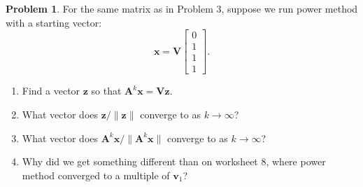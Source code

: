 \documentclass[12pt]{article}
\theoremstyle{definition}
\newtheorem{problem}{Problem}
\renewcommand{\vec}{\mathbf}
\begin{document}
 
\begin{problem}
For the same matrix as in Problem 3, suppose we run power method with a starting vector:
\[
\vec{x} = \vec{V}\begin{bmatrix}0\\1\\1\\1\end{bmatrix}.
\]

    \begin{enumerate}
        \item Find a vector $\vec{z}$ so that $\vec{A}^k \vec{x} = \vec{V} \vec{z}$.
        
        \item What vector does $\vec{z} / \|\vec{z}\|$ converge to as $k\to\infty$?

        \item What vector does $\vec{A}^k\vec{x} / \|\vec{A}^k\vec{x}\|$ converge to as $k\to\infty$?

        \item Why did we get something different than on worksheet 8, where power method converged to a multiple of $\vec{v}_1$?
    
    \end{enumerate}
\end{problem}
\end{document}
